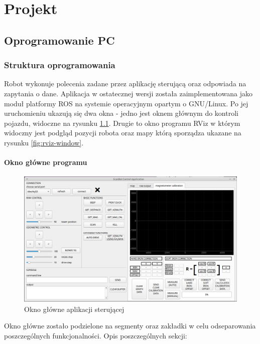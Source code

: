 \chapter{Projekt}
\section{Oprogramowanie PC}
\label{sec:pc-software}
\subsection{Struktura oprogramowania}

Robot wykonuje polecenia zadane przez aplikację sterującą oraz odpowiada na zapytania o dane. Aplikacja w ostatecznej wersji została zaimplementowana jako moduł platformy ROS\cite{ros} na systemie operacyjnym opartym o GNU/Linux. Po jej uruchomieniu ukazują się dwa okna - jedno jest oknem głównym do kontroli pojazdu, widoczne na rysunku \ref{fig:app-main-window}. Drugie to okno programu RViz w którym widoczny jest podgląd pozycji robota oraz mapy którą sporządza ukazane na rysunku \ref{fig:rviz-window}.

\subsubsection{Okno główne programu}
\begin{figure}[ht]
	\centering
		\includegraphics[width=1\linewidth]{rys/main-app-view-3.PNG}
	\caption{Okno główne aplikacji sterującej}
	\label{fig:app-main-window}
\end{figure}

Okno główne zostało podzielone na segmenty oraz zakładki w celu odseparowania poszczególnych funkcjonalności. Opis poszczególnych sekcji:

